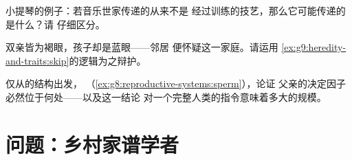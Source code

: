 \begin{exercise}[$\star\star$]\label{exo:g9:heredity-and-traits:10}
小提琴的例子：若音乐世家传递的从来不是
经过训练的技艺，那么它可能传递的是什么？请
仔细区分。
\end{exercise}

\begin{exercise}[$\star\star$]\label{exo:g9:heredity-and-traits:11}
双亲皆为褐眼，孩子却是蓝眼——邻居
便怀疑这一家庭。请运用
\cref{ex:g9:heredity-and-traits:skip}的逻辑为之辩护。
\end{exercise}

\begin{exercise}[$\star\star\star$]\label{exo:g9:heredity-and-traits:12}
仅从的结构出发，
（\cref{ex:g8:reproductive-systems:sperm}），论证
父亲的决定因子必然位于何处——以及这一结论
对一个完整人类的指令意味着多大的规模。
\end{exercise}

\section{问题：乡村家谱学者}

